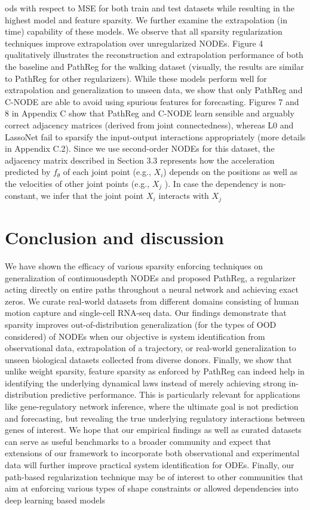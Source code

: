 \documentclass{article}
\begin{document}
    ods with respect to MSE for both train and test datasets while resulting in the highest model and
    feature sparsity.
    We further examine the extrapolation (in time) capability of these models. We observe that all sparsity
    regularization techniques improve extrapolation over unregularized NODEs. Figure 4 qualitatively
    illustrates the reconstruction and extrapolation performance of both the baseline and PathReg for
    the walking dataset (visually, the results are similar to PathReg for other regularizers). While these
    models perform well for extrapolation and generalization to unseen data, we show that only PathReg
    and C-NODE are able to avoid using spurious features for forecasting. Figures 7 and 8 in Appendix C
    show that PathReg and C-NODE learn sensible and arguably correct adjacency matrices (derived
    from joint connectedness), whereas L0 and LassoNet fail to sparsify the input-output interactions
    appropriately (more details in Appendix C.2). Since we use second-order NODEs for this dataset, the
    adjacency matrix described in Section 3.3 represents how the acceleration predicted by $f_{\theta}$ of each
    joint point (e.g., $X_i$) depends on the positions as well as the velocities of other joint points (e.g., $X_j$ ).
    In case the dependency is non-constant, we infer that the joint point $X_i$
    interacts with $X_j$

\section{Conclusion and discussion}
We have shown the efficacy of various sparsity enforcing techniques on generalization of continuousdepth NODEs and proposed PathReg, a regularizer acting directly on entire paths throughout a
neural network and achieving exact zeros. We curate real-world datasets from different domains
consisting of human motion capture and single-cell RNA-seq data. Our findings demonstrate that
sparsity improves out-of-distribution generalization (for the types of OOD considered) of NODEs
when our objective is system identification from observational data, extrapolation of a trajectory,
or real-world generalization to unseen biological datasets collected from diverse donors. Finally,
we show that unlike weight sparsity, feature sparsity as enforced by PathReg can indeed help
in identifying the underlying dynamical laws instead of merely achieving strong in-distribution
predictive performance. This is particularly relevant for applications like gene-regulatory network
inference, where the ultimate goal is not prediction and forecasting, but revealing the true underlying
regulatory interactions between genes of interest. We hope that our empirical findings as well as
curated datasets can serve as useful benchmarks to a broader community and expect that extensions of
our framework to incorporate both observational and experimental data will further improve practical
system identification for ODEs. Finally, our path-based regularization technique may be of interest to
other communities that aim at enforcing various types of shape constraints or allowed dependencies
into deep learning based models
\end{document}
